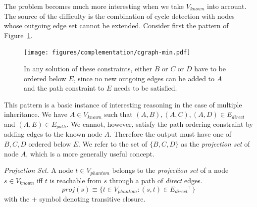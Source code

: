 

The problem becomes much more interesting when we take $V_{known}$
into account. The source of the difficulty is the combination of cycle
detection with nodes whose outgoing edge set cannot be extended.
Consider first the pattern of Figure~\ref{hiercomp/fig:choice}.

\begin{figure}[ht]
  \centering \texttt{[image: figures/complementation/cgraph-min.pdf]}
  \caption[Multiple Inheritance Constraint]{In any solution of these
    constraints, either $B$ or $C$ or $D$ have to be ordered below
    $E$, since no new outgoing edges can be added to $A$ and the path
    constraint to $E$ needs to be satisfied.}
  \label{hiercomp/fig:choice}
\end{figure}

This pattern is a basic instance of interesting reasoning in the case of
multiple inheritance. We have $A \in V_{known}$ such that $(A,B),
(A,C), (A,D) \in E_{direct}$ and $(A,E) \in E_{path}$. We cannot,
however, satisfy the path ordering constraint by adding edges to the
known node $A$. Therefore the output must have one of $B,C,D$ ordered
below $E$. We refer to the set of $\{B,C,D\}$ as the \emph{projection
  set} of node $A$, which is a more generally useful concept.

\begin{defn}{\emph{Projection Set.}}
  A node $t \in V_{phantom}$ belongs to the \emph{projection set} of a
  node $s \in V_{known}$ iff $t$ is reachable from $s$ through a path
  of \emph{direct} edges.
  $$ \textit{proj}(s) \equiv \{t \in V_{phantom}: (s,t) \in {E_{direct}}^+\}$$
  with the $+$ symbol denoting transitive closure.
\end{defn}

